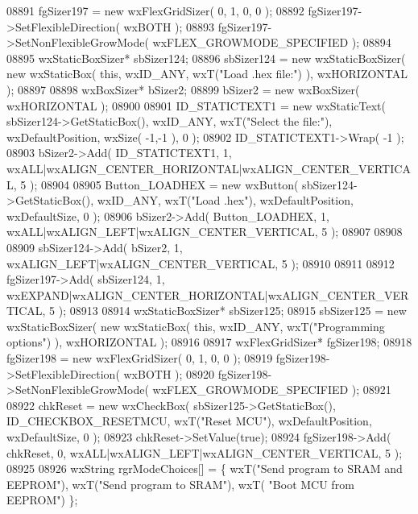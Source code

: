 \begin{DoxyCode}
08891     fgSizer197 = \textcolor{keyword}{new} wxFlexGridSizer( 0, 1, 0, 0 );
08892     fgSizer197->SetFlexibleDirection( wxBOTH );
08893     fgSizer197->SetNonFlexibleGrowMode( wxFLEX\_GROWMODE\_SPECIFIED );
08894     
08895     wxStaticBoxSizer* sbSizer124;
08896     sbSizer124 = \textcolor{keyword}{new} wxStaticBoxSizer( \textcolor{keyword}{new} wxStaticBox( \textcolor{keyword}{this}, wxID\_ANY, wxT(\textcolor{stringliteral}{"Load .hex file:"}) ), 
      wxHORIZONTAL );
08897     
08898     wxBoxSizer* bSizer2;
08899     bSizer2 = \textcolor{keyword}{new} wxBoxSizer( wxHORIZONTAL );
08900     
08901     ID_STATICTEXT1 = \textcolor{keyword}{new} wxStaticText( sbSizer124->GetStaticBox(), wxID\_ANY, wxT(\textcolor{stringliteral}{"Select the file:"}), 
      wxDefaultPosition, wxSize( -1,-1 ), 0 );
08902     ID_STATICTEXT1->Wrap( -1 );
08903     bSizer2->Add( ID_STATICTEXT1, 1, wxALL|wxALIGN\_CENTER\_HORIZONTAL|wxALIGN\_CENTER\_VERTICAL, 5 );
08904     
08905     Button_LOADHEX = \textcolor{keyword}{new} wxButton( sbSizer124->GetStaticBox(), wxID\_ANY, wxT(\textcolor{stringliteral}{"Load .hex"}), 
      wxDefaultPosition, wxDefaultSize, 0 );
08906     bSizer2->Add( Button_LOADHEX, 1, wxALL|wxALIGN\_LEFT|wxALIGN\_CENTER\_VERTICAL, 5 );
08907     
08908     
08909     sbSizer124->Add( bSizer2, 1, wxALIGN\_LEFT|wxALIGN\_CENTER\_VERTICAL, 5 );
08910     
08911     
08912     fgSizer197->Add( sbSizer124, 1, wxEXPAND|wxALIGN\_CENTER\_HORIZONTAL|wxALIGN\_CENTER\_VERTICAL, 5 );
08913     
08914     wxStaticBoxSizer* sbSizer125;
08915     sbSizer125 = \textcolor{keyword}{new} wxStaticBoxSizer( \textcolor{keyword}{new} wxStaticBox( \textcolor{keyword}{this}, wxID\_ANY, wxT(\textcolor{stringliteral}{"Programming options"}) ), 
      wxHORIZONTAL );
08916     
08917     wxFlexGridSizer* fgSizer198;
08918     fgSizer198 = \textcolor{keyword}{new} wxFlexGridSizer( 0, 1, 0, 0 );
08919     fgSizer198->SetFlexibleDirection( wxBOTH );
08920     fgSizer198->SetNonFlexibleGrowMode( wxFLEX\_GROWMODE\_SPECIFIED );
08921     
08922     chkReset = \textcolor{keyword}{new} wxCheckBox( sbSizer125->GetStaticBox(), ID_CHECKBOX_RESETMCU, wxT(\textcolor{stringliteral}{"Reset MCU"}), 
      wxDefaultPosition, wxDefaultSize, 0 );
08923     chkReset->SetValue(\textcolor{keyword}{true}); 
08924     fgSizer198->Add( chkReset, 0, wxALL|wxALIGN\_LEFT|wxALIGN\_CENTER\_VERTICAL, 5 );
08925     
08926     wxString rgrModeChoices[] = \{ wxT(\textcolor{stringliteral}{"Send program to SRAM and EEPROM"}), wxT(\textcolor{stringliteral}{"Send program to SRAM"}), wxT(\textcolor{stringliteral}{
      "Boot MCU from EEPROM"}) \};

\end{DoxyCode}

